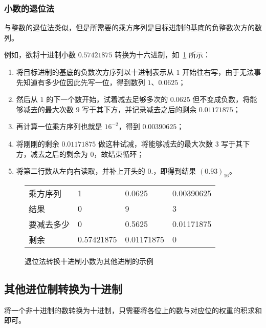         \subsubsection{小数的退位法}\label{subsubsec:NumberSystemBasics/PositionalNotationConversion/FromDecimal/FractalDescendingSubtraction}
            与整数的退位法类似，但是所需要的乘方序列是目标进制的基底的负整数次方的数列。

            例如，欲将十进制小数 $0.57421875$ 转换为十六进制，如~\ref{fig:NumberSystemBasics/PositionalNotationConversion/FromDecimal/FractalDescendingSubtraction/Sample} 所示：

            \begin{enumerate}
                \item 将目标进制的基底的负数次方序列以十进制表示从 $1$ 开始往右写，由于无法事先知道有多少位因此先写一位，得到数列 $1$、$0.0625$；
                \item 然后从 $1$ 的下一个数开始，试着减去足够多次的 $0.0625$ 但不变成负数，将能够减去的最大次数 $9$ 写于其下方，并记录减去之后的剩余 $0.01171875$；
                \item 再计算一位乘方序列也就是 $16^{-2}$，得到 $0.00390625$；
                \item 将刚刚的剩余 $0.01171875$ 做这种试减，将能够减去的最大次数 $3$ 写于其下方，减去之后的剩余为 $0$，故结束循环；
                \item 将第二行数从左向右读取，并补上开头的 $0.$，即得到结果 $(0.93)_{16}$。
            \end{enumerate}

            \begin{figure}
                \centering
                \begin{tabular}{llll}
                    乘方序列   & 1          & 0.0625     & 0.00390625 \\
                    结果       & 0          &          9 &          3 \\ \hline
                    要减去多少 & 0          & 0.5625     & 0.01171875 \\
                    剩余       & 0.57421875 & 0.01171875 & 0
                \end{tabular}
                \caption{退位法转换十进制小数为其他进制的示例}
                \label{fig:NumberSystemBasics/PositionalNotationConversion/FromDecimal/FractalDescendingSubtraction/Sample}
            \end{figure}

    \subsection{其他进位制转换为十进制}\label{subsec:NumberSystemBaiscs/PositionalNotationConversion/ToDecimal}
        将一个非十进制的数转换为十进制，只需要将各位上的数与对应位的权重的积求和即可。

